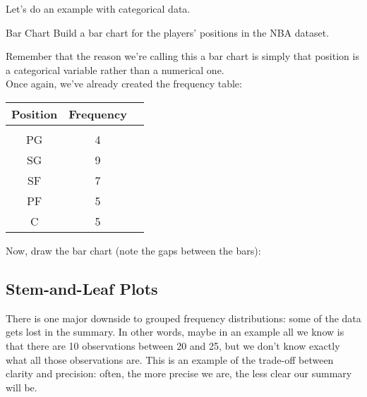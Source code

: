Let's do an example with categorical data.

\begin{example}[https://www.youtube.com/watch?v=FDx4VeH02jc&list=PLfmpjsIzhzttL_Uec2nCbDRcAcUF7NKG8&index=11]{Bar Chart}
Build a bar chart for the players' positions in the NBA dataset.

\sol
Remember that the reason we're calling this a bar chart is simply that position is a categorical variable rather than a numerical one.\\

Once again, we've already created the frequency table:
\begin{center}
\begin{tabular}{c c c}
\textbf{Position} & \textbf{Frequency}\\
\hline
& & \\
PG & 4\\
SG & 9\\
SF & 7\\
PF & 5\\
C & 5
\end{tabular}
\end{center}

Now, draw the bar chart (note the gaps between the bars):
\begin{center}
\end{center}
\end{example}

\subsection{Stem-and-Leaf Plots}
There is one major downside to grouped frequency distributions: some of the data gets lost in the summary.  In other words, maybe in an example all we know is that there are 10 observations between 20 and 25, but we don't know exactly what all those observations are.  This is an example of the trade-off between clarity and precision: often, the more precise we are, the less clear our summary will be.


